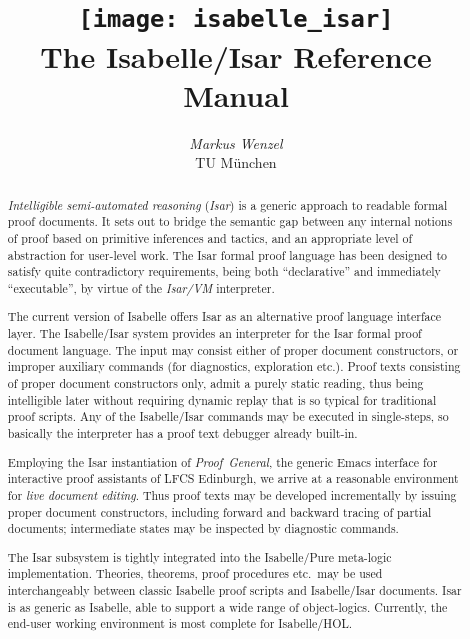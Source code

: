 \documentclass[12pt,a4paper,fleqn]{report}
\title{\texttt{[image: isabelle\_isar]} \\[4ex] The Isabelle/Isar Reference Manual}
\author{\emph{Markus Wenzel} \\ TU M\"unchen}
\begin{document}
\underscoreoff

\maketitle 

\begin{abstract}
  \emph{Intelligible semi-automated reasoning} (\emph{Isar}) is a generic
  approach to readable formal proof documents.  It sets out to bridge the
  semantic gap between any internal notions of proof based on primitive
  inferences and tactics, and an appropriate level of abstraction for
  user-level work.  The Isar formal proof language has been designed to
  satisfy quite contradictory requirements, being both ``declarative'' and
  immediately ``executable'', by virtue of the \emph{Isar/VM} interpreter.
  
  The current version of Isabelle offers Isar as an alternative proof language
  interface layer.  The Isabelle/Isar system provides an interpreter for the
  Isar formal proof document language.  The input may consist either of proper
  document constructors, or improper auxiliary commands (for diagnostics,
  exploration etc.).  Proof texts consisting of proper document constructors
  only, admit a purely static reading, thus being intelligible later without
  requiring dynamic replay that is so typical for traditional proof scripts.
  Any of the Isabelle/Isar commands may be executed in single-steps, so
  basically the interpreter has a proof text debugger already built-in.
  
  Employing the Isar instantiation of \emph{Proof~General}, the generic Emacs
  interface for interactive proof assistants of LFCS Edinburgh, we arrive at a
  reasonable environment for \emph{live document editing}.  Thus proof texts
  may be developed incrementally by issuing proper document constructors,
  including forward and backward tracing of partial documents; intermediate
  states may be inspected by diagnostic commands.
  
  The Isar subsystem is tightly integrated into the Isabelle/Pure meta-logic
  implementation.  Theories, theorems, proof procedures etc.\ may be used
  interchangeably between classic Isabelle proof scripts and Isabelle/Isar
  documents.  Isar is as generic as Isabelle, able to support a wide range of
  object-logics.  Currently, the end-user working environment is most complete
  for Isabelle/HOL.
\end{abstract}

 \tableofcontents \clearfirst

\nocite{Rudnicki:1992:MizarOverview}
\nocite{Harrison:1996:MizarHOL}
\nocite{Rudnicki:1992:MizarOverview}
\nocite{Trybulec:1993:MizarFeatures}
\nocite{Syme:1997:DECLARE}
\nocite{Syme:1998:thesis}
\nocite{Syme:1999:TPHOL}
\nocite{Zammit:1999:TPHOL}








\appendix


\begingroup
   \small\raggedright\frenchspacing
  
\endgroup


\end{document}

